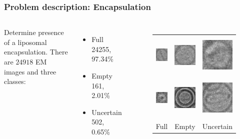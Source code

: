 \documentclass{beamer}
\begin{document}
\begin{frame}
\frametitle{Problem description: Encapsulation}

\begin{columns}
Determine presence of a liposomal encapsulation.
\vskip 0.2in
There are $24918$ EM images and three classes:
\begin{itemize}
\item Full \\ 24255, 97.34\%
\item Empty \\ 161, 2.01\%
\item Uncertain \\ 502, 0.65\%
\end{itemize}
\begin{figure}[H]
\centering
\begin{tabular}{ccc}
	\includegraphics[height=2cm, keepaspectratio]{problem_description/packiging/full} & \includegraphics[height=2cm, keepaspectratio]{problem_description/packiging/empty} & \includegraphics[height=2cm, keepaspectratio]{problem_description/packiging/uncertain} \\
	\includegraphics[height=2cm, keepaspectratio]{problem_description/packiging/full2} & \includegraphics[height=2cm, keepaspectratio]{problem_description/packiging/empty2} & \includegraphics[height=2cm, keepaspectratio]{problem_description/packiging/uncertain2} \\
Full & Empty & Uncertain \\[6pt]
\end{tabular}
\end{figure}
\end{columns}

\end{frame}
\end{document}
